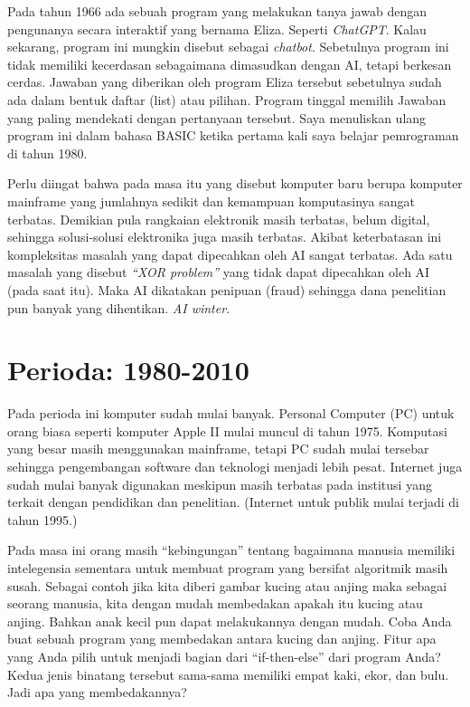 Pada tahun 1966 ada sebuah program yang melakukan tanya jawab dengan
pengunanya secara interaktif yang bernama Eliza. Seperti \emph{ChatGPT}.
Kalau sekarang, program ini mungkin disebut sebagai \emph{chatbot}.
Sebetulnya program ini tidak memiliki kecerdasan sebagaimana dimasudkan
dengan AI, tetapi berkesan cerdas.
Jawaban yang diberikan oleh program Eliza tersebut sebetulnya sudah ada
dalam bentuk daftar (list) atau pilihan. Program tinggal memilih Jawaban
yang paling mendekati dengan pertanyaan tersebut.
Saya menuliskan ulang program ini dalam bahasa BASIC ketika pertama kali
saya belajar pemrograman di tahun 1980.

Perlu diingat bahwa pada masa itu yang disebut komputer baru berupa
komputer mainframe yang jumlahnya sedikit dan kemampuan komputasinya
sangat terbatas.
Demikian pula rangkaian elektronik masih terbatas, belum digital,
sehingga solusi-solusi elektronika juga masih terbatas.
Akibat keterbatasan ini kompleksitas masalah yang dapat dipecahkan oleh AI
sangat terbatas.
Ada satu masalah yang disebut \emph{``XOR problem''} yang tidak dapat
dipecahkan oleh AI (pada saat itu).
Maka AI dikatakan penipuan (fraud) sehingga dana penelitian pun banyak
yang dihentikan. \emph{AI winter.}


\section{Perioda: 1980-2010}
Pada perioda ini komputer sudah mulai banyak.
Personal Computer (PC) untuk orang biasa seperti komputer Apple II
mulai muncul di tahun 1975. Komputasi yang besar masih menggunakan
mainframe, tetapi PC sudah mulai tersebar sehingga pengembangan software
dan teknologi menjadi lebih pesat.
Internet juga sudah mulai banyak digunakan meskipun masih terbatas
pada institusi yang terkait dengan pendidikan dan penelitian.
(Internet untuk publik mulai terjadi di tahun 1995.)

Pada masa ini orang masih ``kebingungan'' tentang bagaimana manusia
memiliki intelegensia sementara untuk membuat program yang bersifat
algoritmik masih susah.
Sebagai contoh jika kita diberi gambar kucing atau anjing maka sebagai
seorang manusia, kita dengan mudah membedakan apakah itu kucing atau
anjing. Bahkan anak kecil pun dapat melakukannya dengan mudah.
Coba Anda buat sebuah program yang membedakan antara kucing dan anjing.
Fitur apa yang Anda pilih untuk menjadi bagian dari ``if-then-else''
dari program Anda? Kedua jenis binatang tersebut sama-sama memiliki
empat kaki, ekor, dan bulu. Jadi apa yang membedakannya?


